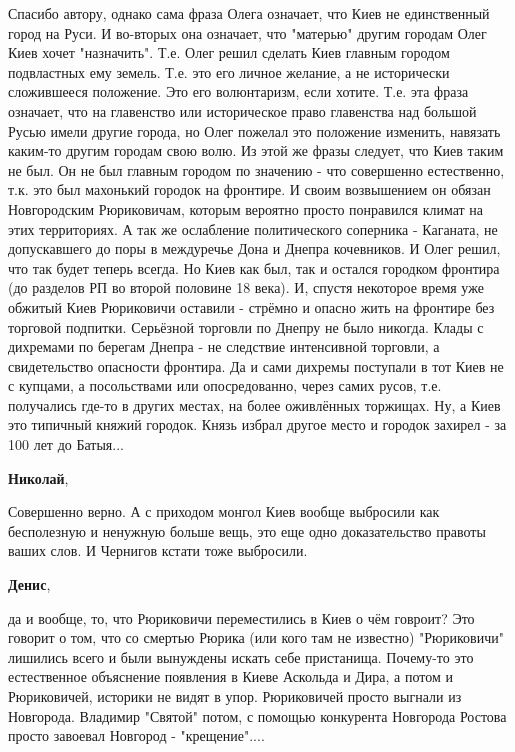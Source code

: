 \begin{itemize}
Спасибо автору, однако сама фраза Олега означает, что Киев не единственный
город на Руси. И во-вторых она означает, что "матерью" другим городам Олег Киев
хочет "назначить". Т.е. Олег решил сделать Киев главным городом подвластных ему
земель. Т.е. это его личное желание, а не исторически сложившееся положение.
Это его волюнтаризм, если хотите. Т.е. эта фраза означает, что на главенство
или историческое право главенства над большой Русью имели другие города, но
Олег пожелал это положение изменить, навязать каким-то другим городам свою
волю. Из этой же фразы следует, что Киев таким не был. Он не был главным
городом по значению - что совершенно естественно, т.к. это был махонький
городок на фронтире. И своим возвышением он обязан Новгородским Рюриковичам,
которым вероятно просто понравился климат на этих территориях. А так же
ослабление политического соперника - Каганата, не допускавшего до поры в
междуречье Дона и Днепра кочевников. И Олег решил, что так будет теперь всегда.
Но Киев как был, так и остался городком фронтира (до разделов РП во второй
половине 18 века). И, спустя некоторое время уже обжитый Киев Рюриковичи
оставили - стрёмно и опасно жить на фронтире без торговой подпитки. Серьёзной
торговли по Днепру не было никогда. Клады с дихремами по берегам Днепра - не
следствие интенсивной торговли, а свидетельство опасности фронтира. Да и сами
дихремы поступали в тот Киев не с купцами, а посольствами или опосредованно,
через самих русов, т.е. получались где-то в других местах, на более оживлённых
торжищах. Ну, а Киев это типичный княжий городок. Князь избрал другое место и
городок захирел - за 100 лет до Батыя...

\begin{itemize} %
\textbf{Николай}, 

Совершенно верно. А с приходом монгол Киев вообще выбросили как бесполезную и
ненужную больше вещь, это еще одно доказательство правоты ваших слов. И
Чернигов кстати тоже выбросили.

\textbf{Денис}, 

да и вообще, то, что Рюриковичи переместились в Киев о чём говроит? Это говорит
о том, что со смертью Рюрика (или кого там не известно) "Рюриковичи" лишились
всего и были вынуждены искать себе пристанища. Почему-то это естественное
объяснение появления в Киеве Аскольда и Дира, а потом и Рюриковичей, историки
не видят в упор. Рюриковичей просто выгнали из Новгорода. Владимир "Святой"
потом, с помощью конкурента Новгорода Ростова просто завоевал Новгород -
"крещение"....


\end{itemize}
\end{itemize}
